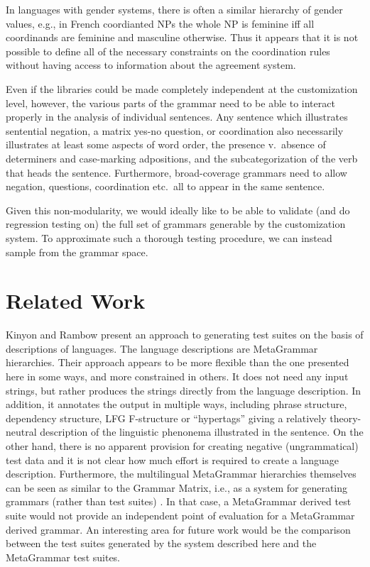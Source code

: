 \documentclass[11pt]{article}
\begin{document}
%
In languages with gender systems, there is often a similar hierarchy
of gender values, e.g., in French coordianted NPs the whole NP is feminine
iff all coordinands are feminine and masculine otherwise.  Thus
it appears that it is not possible to define all of the necessary
constraints on the coordination rules without having access to information
about the agreement system.  

Even if the libraries could be made completely independent at the
customization level, however, the various parts of the grammar need to
be able to interact properly in the analysis of individual sentences.
Any sentence which illustrates sentential negation, a matrix yes-no
question, or coordination also necessarily illustrates at least some
aspects of word order, the presence v.\ absence of determiners and
case-marking adpositions, and the subcategorization of the verb that
heads the sentence.  Furthermore, broad-coverage grammars need to
allow negation, questions, coordination etc.\ all to appear in the
same sentence.

Given this non-modularity, we would ideally like to be able to
validate (and do regression testing on) the full set of grammars
generable by the customization system.  To approximate such a thorough
testing procedure, we can instead sample from the grammar space.

\section{Related Work}
\label{rw}

Kinyon and Rambow  present an approach to
generating test suites on the basis of descriptions of languages.  The
language descriptions are MetaGrammar hierarchies. Their approach
appears to be more flexible than the one presented here in some ways,
and more constrained in others.  It does not need any input strings,
but rather produces the strings directly from the language
description. In addition, it annotates the output in multiple ways,
including phrase structure, dependency structure, LFG F-structure or
``hypertags'' giving a relatively theory-neutral description of the
linguistic phenonema illustrated in the sentence.  On the other hand,
there is no apparent provision for creating negative (ungrammatical)
test data and it is not clear how much effort is required to create a
language description.  Furthermore, the multilingual MetaGrammar
hierarchies themselves can be seen as similar to the Grammar Matrix,
i.e., as a system for generating grammars (rather than test suites)
\cite{Kin:Ram:Sch:Yoo:Jos:06}.  In that case, a MetaGrammar derived
test suite would not provide an independent point of evaluation for a
MetaGrammar derived grammar.  An interesting area for future work
would be the comparison between the test suites generated by the
system described here and the MetaGrammar test suites.
\end{document}
